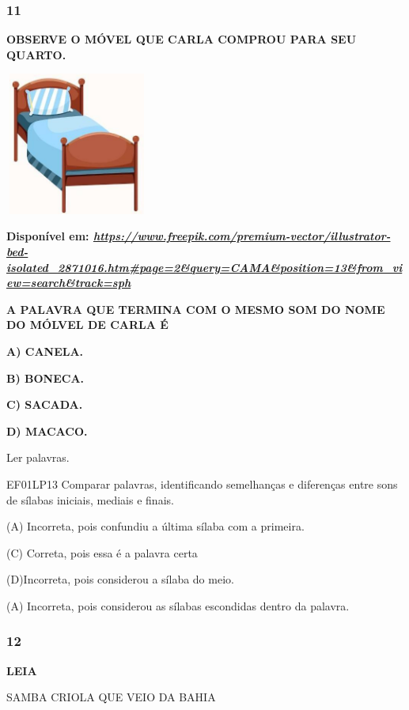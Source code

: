 \begin{escola}
\subsubsection{11}\label{section-67}

\textbf{OBSERVE O MÓVEL QUE CARLA COMPROU PARA SEU QUARTO.}

\includegraphics[width=1.84783in,height=1.84783in]{media/image235.jpg}

\textbf{Disponível em:
\href{https://www.freepik.com/premium-vector/illustrator-bed-isolated_2871016.htm\#page=2\&query=CAMA\&position=13\&from_view=search\&track=sph}{\emph{https://www.freepik.com/premium-vector/illustrator-bed-isolated\_2871016.htm\#page=2\&query=CAMA\&position=13\&from\_view=search\&track=sph}}}

\textbf{A PALAVRA QUE TERMINA COM O MESMO SOM DO NOME DO MÓLVEL DE CARLA
É}

\textbf{A) CANELA.}

\textbf{B) BONECA.}

\textbf{C) SACADA.}

\textbf{D) MACACO.}

Ler palavras.

EF01LP13 Comparar palavras, identificando semelhanças e diferenças entre
sons de sílabas iniciais, mediais e finais.

(A) Incorreta, pois confundiu a última sílaba com a primeira.

(C) Correta, pois essa é a palavra certa

(D)Incorreta, pois considerou a sílaba do meio.

(A) Incorreta, pois considerou as sílabas escondidas dentro da palavra.

\subsubsection{12}\label{section-68}

\textbf{LEIA}

SAMBA CRIOLA QUE VEIO DA BAHIA


\end{escola}
